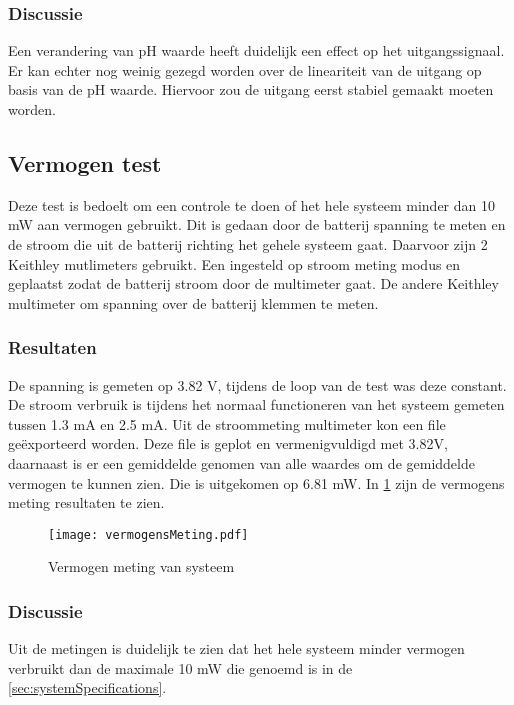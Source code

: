 \subsubsection{Discussie}
Een verandering van pH waarde heeft duidelijk een effect op het uitgangssignaal. Er kan echter nog weinig gezegd worden over de lineariteit van de uitgang op basis van de pH waarde. Hiervoor zou de uitgang eerst stabiel gemaakt moeten worden.



\subsection{Vermogen test}
Deze test is bedoelt om een controle te doen of het hele systeem minder dan 10 mW aan vermogen gebruikt. Dit is gedaan door de batterij spanning te meten en de stroom die uit de batterij richting het gehele systeem gaat. Daarvoor zijn 2 Keithley mutlimeters gebruikt. Een ingesteld op stroom meting modus en geplaatst zodat de batterij stroom door de multimeter gaat. De andere Keithley multimeter om spanning over de batterij klemmen te meten. 

\subsubsection{Resultaten}
De spanning is gemeten op 3.82 V, tijdens de loop van de test was deze constant. De stroom verbruik is tijdens het normaal functioneren van het systeem gemeten tussen 1.3 mA en 2.5 mA. Uit de stroommeting multimeter kon een file geëxporteerd worden. Deze file is geplot en vermenigvuldigd met 3.82V, daarnaast is er een gemiddelde genomen van alle waardes om de gemiddelde vermogen te kunnen zien. Die is uitgekomen op 6.81 mW. In \cref{fig:vermogenMeting} zijn de vermogens meting resultaten te zien.

\begin{figure}[ht]
    \centering
    \texttt{[image: vermogensMeting.pdf]}
    \caption{Vermogen meting van systeem}
    \label{fig:vermogenMeting}
\end{figure}

\subsubsection{Discussie}
Uit de metingen is duidelijk te zien dat het hele systeem minder vermogen verbruikt dan de maximale 10 mW die genoemd is in de \cref{sec:systemSpecifications}. 


